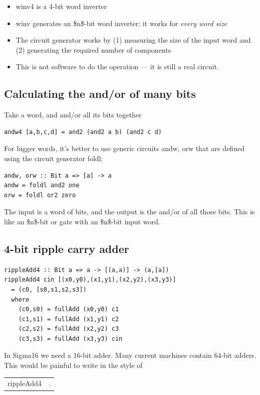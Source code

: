 \documentclass[]{svmono}
\begin{document}
\begin{itemize}
\item winv4 is a 4-bit word inverter
\item winv generates an \$n\$-bit word inverter: it works for
\emph{every word size}
\item The circuit generator works by (1) measuring the size of the
input word and (2) generating the required number of components
\item This is not software to do the operation --- it is
still a real circuit.
\end{itemize}
\subsection*{Calculating the and/or of many bits}
\label{sec:org9af07d7}

Take a word, and and/or all its bits together

\begin{verbatim}
andw4 [a,b,c,d] = and2 (and2 a b) (and2 c d)
\end{verbatim}

For bigger words, it's better to use generic circuits andw, orw that
are defined using the circuit generator foldl:

\begin{verbatim}
andw, orw :: Bit a => [a] -> a
andw = foldl and2 one
orw = foldl or2 zero
\end{verbatim}

The input is a word of bits, and the output is the and/or of all those
bits.  This is like an \$n\$-bit or gate with an \$n\$-bit input word.
\subsection*{4-bit ripple carry adder}
\label{sec:org07616df}

\begin{verbatim}
rippleAdd4 :: Bit a => a -> [(a,a)] -> (a,[a])
rippleAdd4 cin [(x0,y0),(x1,y1),(x2,y2),(x3,y3)]
  = (c0, [s0,s1,s2,s3])
  where
    (c0,s0) = fullAdd (x0,y0) c1
    (c1,s1) = fullAdd (x1,y1) c2
    (c2,s2) = fullAdd (x2,y2) c3
    (c3,s3) = fullAdd (x3,y3) cin
\end{verbatim}

In Sigma16 we need a 16-bit adder.  Many current machines contain
64-bit adders.  This would be painful to write in the style of
\begin{center}
\begin{tabular}{ll}
rippleAdd4 & .\\
\end{tabular}
\end{center}
\end{document}
